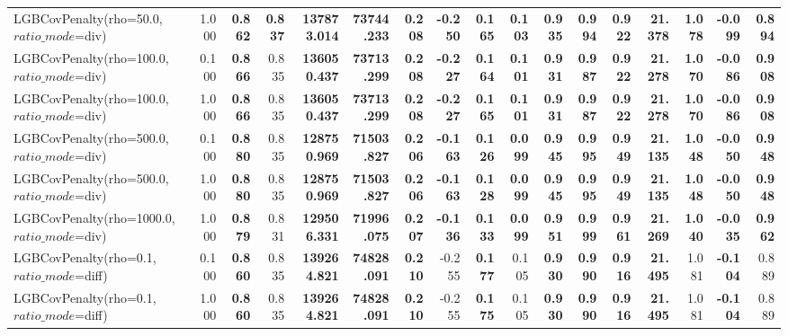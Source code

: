 \documentclass[11pt]{article}
\theoremstyle{plain}
\theoremstyle{definition}
\newcommand{\1}{\mathbf{1}}
\begin{document}
\begin{table}[htbp]
{\begin{tabular}{lrrrrrrrrrrrrrrrr}
LGBCovPenalty(rho=50.0, $ratio\_mode$=div) & 1.000 & \textbf{0.862} & \textbf{0.837} & \textbf{137873.014} & \textbf{73744.233} & \textbf{0.208} & \textbf{-0.250} & \textbf{0.165} & \textbf{0.103} & \textbf{0.935} & \textbf{0.994} & \textbf{0.922} & \textbf{21.378} & \textbf{1.078} & \textbf{-0.099} & \textbf{0.894} \\
LGBCovPenalty(rho=100.0, $ratio\_mode$=div) & 0.100 & \textbf{0.866} & 0.835 & \textbf{136050.437} & \textbf{73713.299} & \textbf{0.208} & \textbf{-0.227} & \textbf{0.164} & \textbf{0.101} & \textbf{0.931} & \textbf{0.987} & \textbf{0.922} & \textbf{21.278} & \textbf{1.070} & \textbf{-0.086} & \textbf{0.908} \\
LGBCovPenalty(rho=100.0, $ratio\_mode$=div) & 1.000 & \textbf{0.866} & 0.835 & \textbf{136050.437} & \textbf{73713.299} & \textbf{0.208} & \textbf{-0.227} & \textbf{0.165} & \textbf{0.101} & \textbf{0.931} & \textbf{0.987} & \textbf{0.922} & \textbf{21.278} & \textbf{1.070} & \textbf{-0.086} & \textbf{0.908} \\
LGBCovPenalty(rho=500.0, $ratio\_mode$=div) & 0.100 & \textbf{0.880} & 0.835 & \textbf{128750.969} & \textbf{71503.827} & \textbf{0.206} & \textbf{-0.163} & \textbf{0.126} & \textbf{0.099} & \textbf{0.945} & \textbf{0.995} & \textbf{0.949} & \textbf{21.135} & \textbf{1.048} & \textbf{-0.050} & \textbf{0.948} \\
LGBCovPenalty(rho=500.0, $ratio\_mode$=div) & 1.000 & \textbf{0.880} & 0.835 & \textbf{128750.969} & \textbf{71503.827} & \textbf{0.206} & \textbf{-0.163} & \textbf{0.128} & \textbf{0.099} & \textbf{0.945} & \textbf{0.995} & \textbf{0.949} & \textbf{21.135} & \textbf{1.048} & \textbf{-0.050} & \textbf{0.948} \\
LGBCovPenalty(rho=1000.0, $ratio\_mode$=div) & 1.000 & \textbf{0.879} & 0.831 & \textbf{129506.331} & \textbf{71996.075} & \textbf{0.207} & \textbf{-0.136} & \textbf{0.133} & \textbf{0.099} & \textbf{0.951} & \textbf{0.999} & \textbf{0.961} & \textbf{21.269} & \textbf{1.040} & \textbf{-0.035} & \textbf{0.962} \\
LGBCovPenalty(rho=0.1, $ratio\_mode$=diff) & 0.100 & \textbf{0.860} & 0.835 & \textbf{139264.821} & \textbf{74828.091} & \textbf{0.210} & -0.255 & \textbf{0.177} & 0.105 & \textbf{0.930} & \textbf{0.990} & \textbf{0.916} & \textbf{21.495} & 1.081 & \textbf{-0.104} & 0.889 \\
LGBCovPenalty(rho=0.1, $ratio\_mode$=diff) & 1.000 & \textbf{0.860} & 0.835 & \textbf{139264.821} & \textbf{74828.091} & \textbf{0.210} & -0.255 & \textbf{0.175} & 0.105 & \textbf{0.930} & \textbf{0.990} & \textbf{0.916} & \textbf{21.495} & 1.081 & \textbf{-0.104} & 0.889 \\

\end{tabular}}
\end{table}
\end{document}
